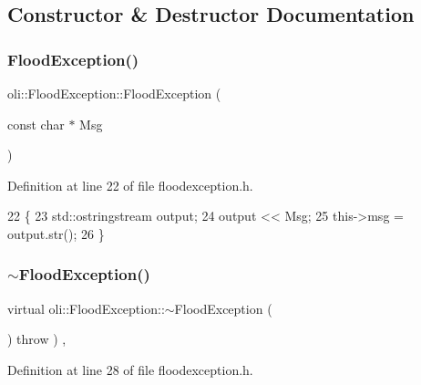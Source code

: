 \subsection{Constructor \& Destructor Documentation}
\hypertarget{classoli_1_1_flood_exception_a98d7a32c0eef6440e94cae847fa0c4ba}{}\label{classoli_1_1_flood_exception_a98d7a32c0eef6440e94cae847fa0c4ba} 
\subsubsection{\texorpdfstring{Flood\+Exception()}{FloodException()}}
{\footnotesize\ttfamily oli\+::\+Flood\+Exception\+::\+Flood\+Exception (\begin{DoxyParamCaption}\item[{const char $\ast$}]{Msg }\end{DoxyParamCaption})\hspace{0.3cm}{\ttfamily [inline]}}



Definition at line 22 of file floodexception.\+h.


\begin{DoxyCode}
22                                      \{
23         std::ostringstream output;
24         output << Msg;
25         this->msg = output.str();
26     \}
\end{DoxyCode}
\hypertarget{classoli_1_1_flood_exception_a7c5320db13b3e5c1082ab933a6dd0bd0}{}\label{classoli_1_1_flood_exception_a7c5320db13b3e5c1082ab933a6dd0bd0} 
\subsubsection{\texorpdfstring{$\sim$\+Flood\+Exception()}{~FloodException()}}
{\footnotesize\ttfamily virtual oli\+::\+Flood\+Exception\+::$\sim$\+Flood\+Exception (\begin{DoxyParamCaption}{ }\end{DoxyParamCaption}) throw  ) \hspace{0.3cm}{\ttfamily [inline]}, {\ttfamily [virtual]}}



Definition at line 28 of file floodexception.\+h.


